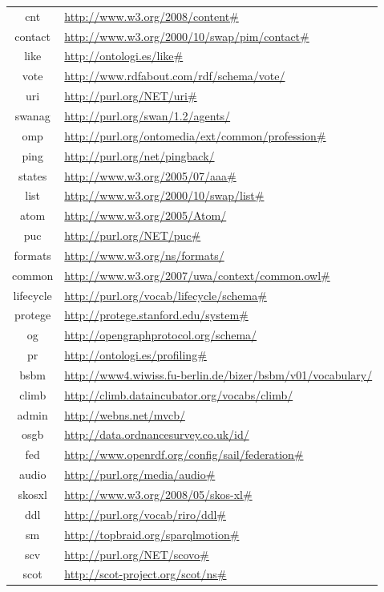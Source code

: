 \documentclass{article}
\begin{document}
\begin{longtable}{ c | p{8cm} }
cnt & \url{http://www.w3.org/2008/content#} \\
contact & \url{http://www.w3.org/2000/10/swap/pim/contact#} \\
like & \url{http://ontologi.es/like#} \\
vote & \url{http://www.rdfabout.com/rdf/schema/vote/} \\
uri & \url{http://purl.org/NET/uri#} \\
swanag & \url{http://purl.org/swan/1.2/agents/} \\
omp & \url{http://purl.org/ontomedia/ext/common/profession#} \\
ping & \url{http://purl.org/net/pingback/} \\
states & \url{http://www.w3.org/2005/07/aaa#} \\
list & \url{http://www.w3.org/2000/10/swap/list#} \\
atom & \url{http://www.w3.org/2005/Atom/} \\
puc & \url{http://purl.org/NET/puc#} \\
formats & \url{http://www.w3.org/ns/formats/} \\
common & \url{http://www.w3.org/2007/uwa/context/common.owl#} \\
lifecycle & \url{http://purl.org/vocab/lifecycle/schema#} \\
protege & \url{http://protege.stanford.edu/system#} \\
og & \url{http://opengraphprotocol.org/schema/} \\
pr & \url{http://ontologi.es/profiling#} \\
bsbm & \url{http://www4.wiwiss.fu-berlin.de/bizer/bsbm/v01/vocabulary/} \\
climb & \url{http://climb.dataincubator.org/vocabs/climb/} \\
admin & \url{http://webns.net/mvcb/} \\
osgb & \url{http://data.ordnancesurvey.co.uk/id/} \\
fed & \url{http://www.openrdf.org/config/sail/federation#} \\
audio & \url{http://purl.org/media/audio#} \\
skosxl & \url{http://www.w3.org/2008/05/skos-xl#} \\
ddl & \url{http://purl.org/vocab/riro/ddl#} \\
sm & \url{http://topbraid.org/sparqlmotion#} \\
scv & \url{http://purl.org/NET/scovo#} \\
scot & \url{http://scot-project.org/scot/ns#} \\

\end{longtable}
\end{document}
